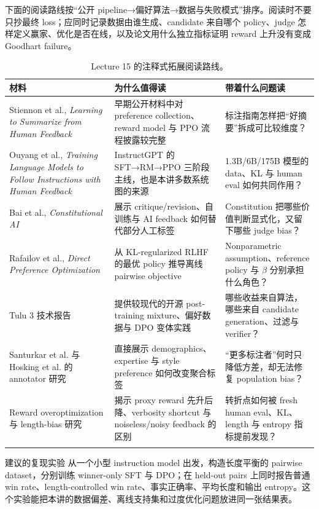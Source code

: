 \documentclass[a4paper]{article}
\begin{document}
下面的阅读路线按“公开 pipeline→偏好算法→数据与失败模式”排序。阅读时不要只抄最终 loss；应同时记录数据由谁生成、candidate 来自哪个 policy、judge 怎样定义赢家、优化是否在线，以及论文用什么独立指标证明 reward 上升没有变成 Goodhart failure。

\begin{longtable}{L{0.23\textwidth}L{0.31\textwidth}L{0.36\textwidth}}
\toprule
材料 & 为什么值得读 & 带着什么问题读 \\
\midrule
Stiennon et al., \emph{Learning to Summarize from Human Feedback} & 早期公开材料中对 preference collection、reward model 与 PPO 流程披露较完整 & 标注指南怎样把“好摘要”拆成可比较维度？ \\
Ouyang et al., \emph{Training Language Models to Follow Instructions with Human Feedback} & InstructGPT 的 SFT→RM→PPO 三阶段主线，也是本讲多数系统图的来源 & 1.3B/6B/175B 模型的 data、KL 与 human eval 如何共同作用？ \\
Bai et al., \emph{Constitutional AI} & 展示 critique/revision、自训练与 AI feedback 如何替代部分人工标签 & Constitution 把哪些价值判断显式化，又留下哪些 judge bias？ \\
Rafailov et al., \emph{Direct Preference Optimization} & 从 KL-regularized RLHF 的最优 policy 推导离线 pairwise objective & Nonparametric assumption、reference policy 与 $\beta$ 分别承担什么角色？ \\
Tulu 3 技术报告 & 提供较现代的开源 post-training mixture、偏好数据与 DPO 变体实践 & 哪些收益来自算法，哪些来自 candidate generation、过滤与 verifier？ \\
Santurkar et al. 与 Hosking et al. 的 annotator 研究 & 直接展示 demographics、expertise 与 style preference 如何改变聚合标签 & “更多标注者”何时只降低方差，却无法修复 population bias？ \\
Reward overoptimization 与 length-bias 研究 & 揭示 proxy reward 先升后降、verbosity shortcut 与 noiseless/noisy feedback 的区别 & 转折点如何被 fresh human eval、KL、length 与 entropy 指标提前发现？ \\
\bottomrule
\caption{Lecture 15 的注释式拓展阅读路线。}
\end{longtable}

\begin{knowledgebox}{建议的复现实验}
从一个小型 instruction model 出发，构造长度平衡的 pairwise dataset，分别训练 winner-only SFT 与 DPO；在 held-out pairs 上同时报告普通 win rate、length-controlled win rate、事实正确率、平均长度和输出 entropy。这个实验能把本讲的数据偏差、离线支持集和过度优化问题放进同一张结果表。
\end{knowledgebox}
\end{document}
